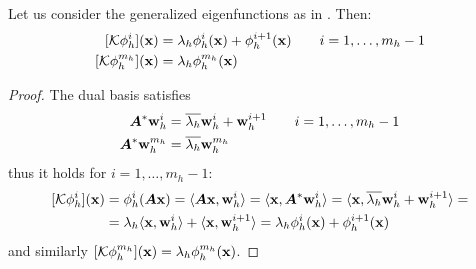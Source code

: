 \begin{lemma}
Let us consider the generalized eigenfunctions as in . Then:
\begin{equation*}
    \begin{split}
        [\mathcal{K}\phi_h^i](\vb{x}) &= \lambda_h \phi_h^i(\vb{x}) + \phi_h^{i+1}(\vb{x}) \qquad i = 1,\dots,m_h-1 \\
        [\mathcal{K}\phi_h^{m_h}](\vb{x}) &= \lambda_h \phi_h^{m_h}(\vb{x})
    \end{split}
\end{equation*}
\end{lemma}
\begin{proof}
The dual basis satisfies
\begin{equation*}
    \begin{split}
        \vb*{A}^*\vb{w}_h^i &= \overline{\lambda_h} \vb{w}_h^i + \vb{w}_h^{i+1} \qquad i = 1,\dots,m_h-1 \\
        \vb*{A}^*\vb{w}_h^{m_h} &= \overline{\lambda_h} \vb{w}_h^{m_h}
    \end{split}
\end{equation*}
thus it holds for $i = 1,\dots,m_h-1 $:
\begin{equation*}
    \begin{split}
        [\mathcal{K}\phi_h^i](\vb{x}) &= \phi_h^i(\vb*{A}\vb{x}) = \langle \vb*{A}\vb{x}, \vb{w}_h^i \rangle = \langle \vb{x}, \vb*{A}^*\vb{w}_h^i \rangle = \langle \vb{x}, \overline{\lambda_h} \vb{w}_h^i + \vb{w}_h^{i+1} \rangle = \\
        & =  \lambda_h \langle \vb{x}, \vb{w}_h^i \rangle + \langle \vb{x}, \vb{w}_h^{i+1} \rangle = \lambda_h \phi_h^i(\vb{x}) + \phi_h^{i+1}(\vb{x})
    \end{split}
\end{equation*}
and similarly $[\mathcal{K}\phi_h^{m_h}](\vb{x}) = \lambda_h \phi_h^{m_h}(\vb{x})$.
\end{proof}

